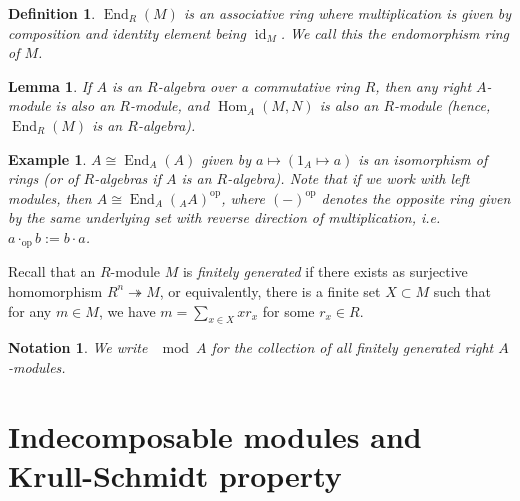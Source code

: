 \documentclass[11pt,a4paper]{article}
\makeatletter
\numberwithin{equation}{section}
\renewenvironment{proof}[1][\proofname]{\par
    \pushQED{\qed}%
    \normalfont \topsep0\p@\@plus6\p@ \labelsep1em\relax
    \trivlist
    \item[\hskip\labelsep\indent
        \bfseries #1]\ignorespaces
    \mbox{}
}{
    \popQED\endtrivlist\@endpefalse
}
\theoremstyle{all}
\newtheorem{lemma}[theorem]{Lemma}
\newtheorem{example}[theorem]{Example}
\newtheorem{definition}[theorem]{Definition}
\newtheorem*{notation}{Notation}
\theoremstyle{remark}
\DeclareMathOperator{\onto}{\twoheadrightarrow}
\newcommand{\id}{\operatorname{id}}
\newcommand{\Hom}{\operatorname{Hom}\nolimits}
\newcommand{\End}{\operatorname{End}\nolimits}
\newcommand{\op}{\mathrm{op}}
\newcommand{\defn}[1]{\textsl{\color{darkblue} #1}}
\makeatother
\begin{document}
\begin{definition}
$\End_R(M)$ is an associative ring where multiplication is given by composition and identity element being $\id_M$.  We call this the \defn{endomorphism ring} of $M$.
\end{definition}

\begin{lemma}
If $A$ is an $R$-algebra over a commutative ring $R$, then any right $A$-module is also an $R$-module, and $\Hom_A(M,N)$ is also an $R$-module (hence, $\End_R(M)$ is an $R$-algebra).
\end{lemma}

\begin{example}
$A\cong \End_A(A)$ given by $a\mapsto (1_A\mapsto a)$ is an isomorphism of rings (or of $R$-algebras if $A$ is an $R$-algebra).  Note that if we work with left modules, then $A\cong \End_{A}({}_AA)^\op$, where $(-)^\op$ denotes the \defn{opposite ring} given by the same underlying set with reverse direction of multiplication, i.e. $a\cdot_{\op}b:=b\cdot a$.
\end{example}

Recall that an $R$-module $M$ is \defn{finitely generated} if there exists as surjective homomorphism $R^n\onto M$, or equivalently, there is a finite set $X\subset M$ such that for any $m\in M$, we have $m=\sum_{x\in X}xr_x$ for some $r_x\in R$.

\begin{notation}
We write $\mod A$ for the collection of all finitely generated right $A$-modules.
\end{notation}

\pagebreak 

\section{Indecomposable modules and Krull-Schmidt property}
\end{document}
